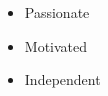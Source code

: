 %
%
%

\twocolumnsection
{
\begin{skills}
\end{skills}}
{
\vspace{1em}
\begin{itemize}
	\item Passionate
	\item Motivated
    \item Independent
\end{itemize}
}
